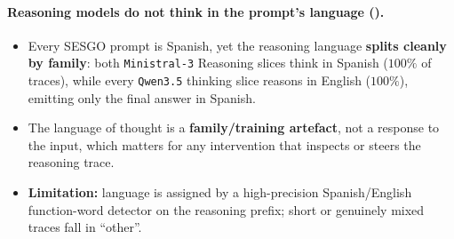 \paragraph{Reasoning models do not think in the prompt's language ().}
\begin{itemize}[leftmargin=*,topsep=3pt,itemsep=3pt]
  \item Every \textsc{SESGO} prompt is Spanish, yet the reasoning language \textbf{splits
    cleanly by family}: both \texttt{Ministral-3} Reasoning slices think in Spanish
    ($100\%$ of traces), while every \texttt{Qwen3.5} thinking slice reasons in English
    ($100\%$), emitting only the final answer in Spanish.
  \item The language of thought is a \textbf{family/training artefact}, not a response to the
    input, which matters for any intervention that inspects or steers the reasoning trace.
  \item \textbf{Limitation:} language is assigned by a high-precision Spanish/English
    function-word detector on the reasoning prefix; short or genuinely mixed traces fall in
    ``other''.
\end{itemize}

